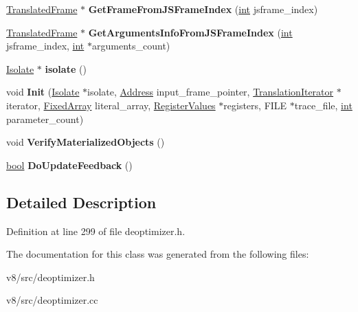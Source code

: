 \begin{DoxyCompactItemize}
\item 
\mbox{\label{classv8_1_1internal_1_1TranslatedState_add1929b6d844e3939dd9ad5dd48bedef}} 
\mbox{\hyperlink{classv8_1_1internal_1_1TranslatedFrame}{Translated\+Frame}} $\ast$ {\bfseries Get\+Frame\+From\+J\+S\+Frame\+Index} (\mbox{\hyperlink{classint}{int}} jsframe\+\_\+index)
\item 
\mbox{\label{classv8_1_1internal_1_1TranslatedState_a38fa0d6f1798ae6ed395a398f263306e}} 
\mbox{\hyperlink{classv8_1_1internal_1_1TranslatedFrame}{Translated\+Frame}} $\ast$ {\bfseries Get\+Arguments\+Info\+From\+J\+S\+Frame\+Index} (\mbox{\hyperlink{classint}{int}} jsframe\+\_\+index, \mbox{\hyperlink{classint}{int}} $\ast$arguments\+\_\+count)
\item 
\mbox{\label{classv8_1_1internal_1_1TranslatedState_a3f7e0c9a867318e6ca1277a882667027}} 
\mbox{\hyperlink{classv8_1_1internal_1_1Isolate}{Isolate}} $\ast$ {\bfseries isolate} ()
\item 
\mbox{\label{classv8_1_1internal_1_1TranslatedState_a5511bc823539a5e62fceda2c63678df2}} 
void {\bfseries Init} (\mbox{\hyperlink{classv8_1_1internal_1_1Isolate}{Isolate}} $\ast$isolate, \mbox{\hyperlink{classuintptr__t}{Address}} input\+\_\+frame\+\_\+pointer, \mbox{\hyperlink{classv8_1_1internal_1_1TranslationIterator}{Translation\+Iterator}} $\ast$iterator, \mbox{\hyperlink{classv8_1_1internal_1_1FixedArray}{Fixed\+Array}} literal\+\_\+array, \mbox{\hyperlink{classv8_1_1internal_1_1RegisterValues}{Register\+Values}} $\ast$registers, F\+I\+LE $\ast$trace\+\_\+file, \mbox{\hyperlink{classint}{int}} parameter\+\_\+count)
\item 
\mbox{\label{classv8_1_1internal_1_1TranslatedState_aada178d5e86c2538090b5d750fc4c8bc}} 
void {\bfseries Verify\+Materialized\+Objects} ()
\item 
\mbox{\label{classv8_1_1internal_1_1TranslatedState_a9d6bb4c635d370f25b77bd35bc0d22df}} 
\mbox{\hyperlink{classbool}{bool}} {\bfseries Do\+Update\+Feedback} ()
\end{DoxyCompactItemize}


\subsection{Detailed Description}


Definition at line 299 of file deoptimizer.\+h.



The documentation for this class was generated from the following files\+:\begin{DoxyCompactItemize}
\item 
v8/src/deoptimizer.\+h\item 
v8/src/deoptimizer.\+cc\end{DoxyCompactItemize}
